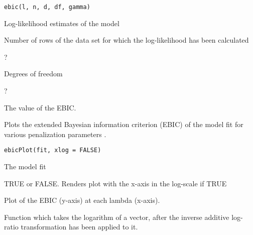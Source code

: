 \documentclass[a4paper]{book}
\begin{document}
%
\begin{Usage}
\begin{verbatim}
ebic(l, n, d, df, gamma)
\end{verbatim}
\end{Usage}
%
\begin{Arguments}
\begin{ldescription}
\item[\code{l}] Log-likelihood estimates of the model

\item[\code{n}] Number of rows of the data set for which the log-likelihood has been 
calculated

\item[\code{d}] ?

\item[\code{df}] Degrees of freedom

\item[\code{gamma}] ?
\end{ldescription}
\end{Arguments}
%
\begin{Value}
The value of the EBIC.
\end{Value}
%
\begin{Description}\relax
Plots the extended Bayesian information criterion (EBIC) of the model fit for
various penalization parameters .
\end{Description}
%
\begin{Usage}
\begin{verbatim}
ebicPlot(fit, xlog = FALSE)
\end{verbatim}
\end{Usage}
%
\begin{Arguments}
\begin{ldescription}
\item[\code{fit}] The model fit

\item[\code{xlog}] TRUE or FALSE. Renders plot with the x-axis in the log-scale if TRUE
\end{ldescription}
\end{Arguments}
%
\begin{Value}
Plot of the EBIC (y-axis) at each lambda (x-axis).
\end{Value}
%
\begin{Description}\relax
Function which takes the logarithm of a vector, after the inverse additive 
log-ratio transformation has been applied to it.
\end{Description}
\end{document}
